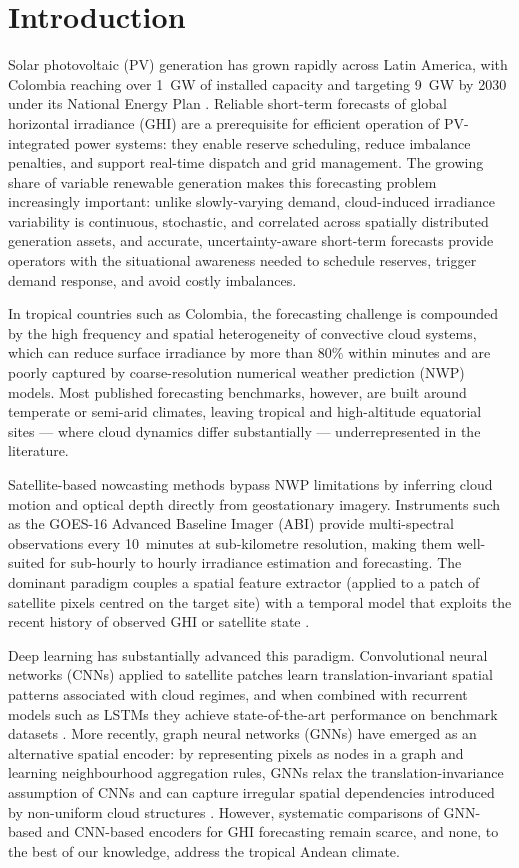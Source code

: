 \section{Introduction}
\label{sec:intro}

Solar photovoltaic (PV) generation has grown rapidly across
Latin America, with Colombia reaching over 1~GW of installed capacity and
targeting 9~GW by 2030 under its National Energy Plan \cite{upme2023}.
Reliable short-term forecasts of global horizontal irradiance (GHI) are a
prerequisite for efficient operation of PV-integrated power systems: they
enable reserve scheduling, reduce imbalance penalties, and support real-time
dispatch and grid management. The growing share of variable renewable
generation makes this forecasting problem increasingly important: unlike
slowly-varying demand, cloud-induced irradiance variability is continuous,
stochastic, and correlated across spatially distributed generation assets,
and accurate, uncertainty-aware short-term forecasts provide operators with
the situational awareness needed to schedule reserves, trigger demand
response, and avoid costly imbalances.

In tropical countries such as Colombia, the forecasting challenge is compounded
by the high frequency and spatial heterogeneity of convective cloud systems,
which can reduce surface irradiance by more than 80\% within minutes and are
poorly captured by coarse-resolution numerical weather prediction (NWP) models.
Most published forecasting benchmarks, however, are built around temperate or
semi-arid climates, leaving tropical and high-altitude equatorial sites ---
where cloud dynamics differ substantially --- underrepresented in the
literature.

Satellite-based nowcasting methods bypass NWP limitations by inferring cloud
motion and optical depth directly from geostationary imagery. Instruments such as
the GOES-16 Advanced Baseline Imager (ABI) provide multi-spectral observations
every 10~minutes at sub-kilometre resolution, making them well-suited for
sub-hourly to hourly irradiance estimation and forecasting. The dominant paradigm
couples a spatial feature extractor (applied to a patch of satellite pixels
centred on the target site) with a temporal model that exploits the recent
history of observed GHI or satellite state \cite{paletta2021,wang2019}.

Deep learning has substantially advanced this paradigm. Convolutional neural
networks (CNNs) applied to satellite patches learn translation-invariant spatial
patterns associated with cloud regimes, and when combined with recurrent models
such as LSTMs they achieve state-of-the-art performance on benchmark datasets
\cite{alessandrini2015,paletta2021}. More recently, graph neural networks
(GNNs) have emerged as an alternative spatial encoder: by representing pixels as
nodes in a graph and learning neighbourhood aggregation rules, GNNs relax the
translation-invariance assumption of CNNs and can capture irregular spatial
dependencies introduced by non-uniform cloud structures \cite{hamilton2017,ji2022}.
However, systematic comparisons of GNN-based and CNN-based encoders for GHI
forecasting remain scarce, and none, to the best of our knowledge, address the
tropical Andean climate.

